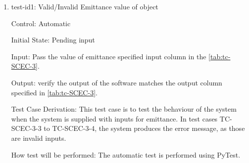 \documentclass[12pt, titlepage]{article}
\begin{document}
\begin{enumerate}   



\item{test-id1: Valid/Invalid Emittance value of object  \\}

Control: Automatic
					
Initial State: Pending input 
					
Input: Pass the value of emittance specified input column in the \autoref{tab:tc-SCEC-3}.
					
Output: verify the output of the software matches the output column specified in \autoref{tab:tc-SCEC-3}. 

Test Case Derivation: This test case is to test the behaviour of the system when the system is supplied with inputs for emittance. In test cases TC-SCEC-3-3 to TC-SCEC-3-4, the system produces the error message, as those are invalid inputs. 
					
How test will be performed: The automatic test is performed using PyTest.  

\end{enumerate}
\end{document}
